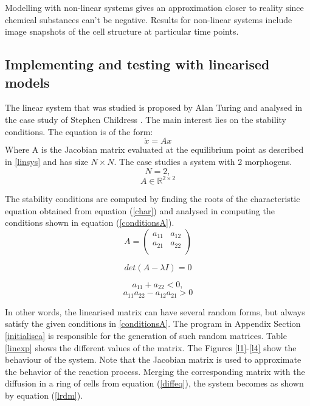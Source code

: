 Modelling with non-linear systems gives an approximation closer to reality since chemical substances can't be negative. Results for non-linear systems include image snapshots of the cell structure at particular time points.

    
\subsection{Implementing and testing with linearised models}
\label{resLinear}
The linear system that was studied is proposed by Alan Turing \cite{turing_chemical_1990} and analysed in the case study of Stephen Childress \cite{childress_case_2005}. The main interest lies on the stability conditions. The equation is of the form:
$$ \dot{x} = Ax $$
Where A is the Jacobian matrix evaluated at the equilibrium point as described in  \ref{linsys} and has size $ N\times N $.
The case studies a system with 2 morphogens. 
$$ N=2,$$
$$ A \in \mathbb{R}^{2\times 2} $$

The stability conditions are computed by finding the roots of the characteristic equation obtained from equation (\ref{char}) and analysed in \cite[p.~5]{childress_case_2005} computing the conditions shown in equation (\ref{conditionsA}).
\begin{equation}
\label{jacobian}
A= 
\begin{pmatrix}
        a_{11} & a_{12} \\
        a_{21} & a_{22} \\
\end{pmatrix}
\end{equation}

\begin{equation}
\label{char}
det(A-\lambda I) = 0 
\end{equation}

$$a_{11} + a_{22} < 0,$$
\begin{equation}
\label{conditionsA}  
 a_{11}a_{22} - a_{12}a_{21} > 0
\end{equation}


In other words, the linearised matrix can have several random forms, but always satisfy the given conditions in \ref{conditionsA}. The program in Appendix Section \ref{initialisea} is responsible for the generation of such random matrices. Table \ref{linexp} shows the different values of the matrix. The Figures \ref{l1}-\ref{l4} show the behaviour of the system. Note that the Jacobian matrix is used to approximate the behavior of the reaction process. Merging the corresponding matrix with the diffusion in a ring of cells from equation (\ref{diffeq}), the system becomes as shown by equation (\ref{lrdm}).

